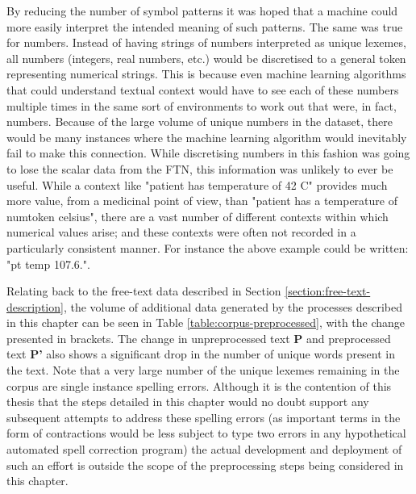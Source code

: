 By reducing the number of symbol patterns it was hoped that a machine could more easily interpret the intended meaning of such patterns. The same was true for numbers. Instead of having strings of numbers interpreted as unique lexemes, all numbers (integers, real numbers, etc.) would be discretised to a general token representing numerical strings. This is because even machine learning algorithms that could understand textual context would have to see each of these numbers multiple times in the same sort of environments to work out that were, in fact, numbers. Because of the large volume of unique numbers in the dataset, there would be many instances where the machine learning algorithm would inevitably fail to make this connection. While discretising numbers in this fashion was going to lose the scalar data from the FTN, this information was unlikely to ever be useful. While a context like "patient has temperature of 42 C" provides much more value, from a medicinal point of view, than "patient has a temperature of numtoken celsius", there are a vast number of different contexts within which numerical values arise; and these contexts were often not recorded in a particularly consistent manner. For instance the above example could be written: "pt temp 107.6.". 

Relating back to the free-text data described in Section \ref{section:free-text-description}, the volume of additional data generated by the processes described in this chapter can be seen in Table \ref{table:corpus-preprocessed}, with the change presented in brackets. The change in unpreprocessed text \textbf{P} and preprocessed text \textbf{P'} also shows a significant drop in the number of unique words present in the text. Note that a very large number of the unique lexemes remaining in the corpus are single instance spelling errors. Although it is the contention of this thesis that the steps detailed in this chapter would no doubt support any subsequent attempts to address these spelling errors (as important terms in the form of contractions would be less subject to type two errors in any hypothetical automated spell correction program) the actual development and deployment of such an effort is outside the scope of the preprocessing steps being considered in this chapter.    


\newcommand{\forceindent}{\leavevmode{\parindent=2em\indent}}






